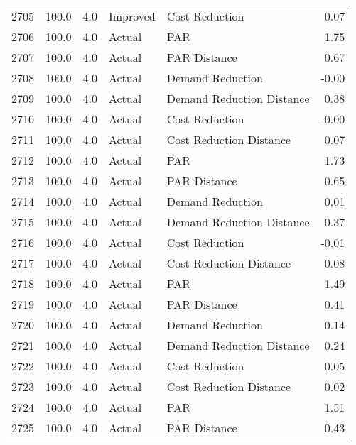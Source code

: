 \begin{longtable}{lrrllr}
2705 &        100.0 &     4.0 &       Improved &             Cost Reduction &   0.07 \\
2706 &        100.0 &     4.0 &         Actual &                        PAR &   1.75 \\
2707 &        100.0 &     4.0 &         Actual &               PAR Distance &   0.67 \\
2708 &        100.0 &     4.0 &         Actual &           Demand Reduction &  -0.00 \\
2709 &        100.0 &     4.0 &         Actual &  Demand Reduction Distance &   0.38 \\
2710 &        100.0 &     4.0 &         Actual &             Cost Reduction &  -0.00 \\
2711 &        100.0 &     4.0 &         Actual &    Cost Reduction Distance &   0.07 \\
2712 &        100.0 &     4.0 &         Actual &                        PAR &   1.73 \\
2713 &        100.0 &     4.0 &         Actual &               PAR Distance &   0.65 \\
2714 &        100.0 &     4.0 &         Actual &           Demand Reduction &   0.01 \\
2715 &        100.0 &     4.0 &         Actual &  Demand Reduction Distance &   0.37 \\
2716 &        100.0 &     4.0 &         Actual &             Cost Reduction &  -0.01 \\
2717 &        100.0 &     4.0 &         Actual &    Cost Reduction Distance &   0.08 \\
2718 &        100.0 &     4.0 &         Actual &                        PAR &   1.49 \\
2719 &        100.0 &     4.0 &         Actual &               PAR Distance &   0.41 \\
2720 &        100.0 &     4.0 &         Actual &           Demand Reduction &   0.14 \\
2721 &        100.0 &     4.0 &         Actual &  Demand Reduction Distance &   0.24 \\
2722 &        100.0 &     4.0 &         Actual &             Cost Reduction &   0.05 \\
2723 &        100.0 &     4.0 &         Actual &    Cost Reduction Distance &   0.02 \\
2724 &        100.0 &     4.0 &         Actual &                        PAR &   1.51 \\
2725 &        100.0 &     4.0 &         Actual &               PAR Distance &   0.43 \\

\end{longtable}
